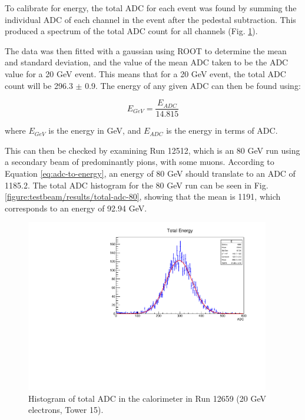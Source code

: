 To calibrate for energy, the total \acrshort{ADC} for each event was found by summing the individual \acrshort{ADC} of each channel in the event after the pedestal subtraction. This produced a spectrum of the total \acrshort{ADC} count for all channels (Fig. \ref{figure:testbeam/results/total-adc-20}).

The data was then fitted with a gaussian using ROOT to determine the mean and standard deviation, and the value of the mean \acrshort{ADC} taken to be the \acrshort{ADC} value for a 20 GeV event. This means that for a 20 GeV event, the total \acrshort{ADC} count will be 296.3 $\pm$ 0.9. The energy of any given ADC can then be found using:

\begin{equation}
	E_{GeV} = \frac{E_{ADC}}{14.815}
\label{eq:adc-to-energy}
\end{equation}

where $E_{GeV}$ is the energy in GeV, and $E_{ADC}$ is the energy in terms of ADC.

This can then be checked by examining Run 12512, which is an 80 GeV run using a secondary beam of predominantly pions, with some muons. According to Equation \ref{eq:adc-to-energy}, an energy of 80 GeV should translate to an ADC of 1185.2. The total ADC histogram for the 80 GeV run can be seen in Fig. \ref{figure:testbeam/results/total-adc-80}, showing that the mean is 1191, which corresponds to an energy of 92.94 GeV.


\begin{figure}[p]
	\centering
	\includegraphics[width=0.95\textwidth]{../Pictures/IDEA/totalEnergyBoth.pdf}
	\caption{Histogram of total \acrshort{ADC} in the calorimeter in Run 12659 (20 GeV electrons, Tower 15).}
	\label{figure:testbeam/results/total-adc-20}
\end{figure}

